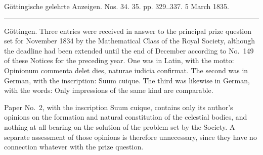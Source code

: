 \clearpage
{}
\begin{center}\small Göttingische gelehrte Anzeigen. Nos. 34. 35. pp. 329..337. 5 March 1835.\\[3pt]\rule{.72\linewidth}{.3pt}\end{center}

Göttingen. Three entries were received in answer to the principal prize question set for November 1834 by the Mathematical Class of the Royal Society, although the deadline had been extended until the end of December according to No.~149 of these Notices for the preceding year. One was in Latin, with the motto: Opinionum commenta delet dies, naturae iudicia confirmat. The second was in German, with the inscription: Suum cuique. The third was likewise in German, with the words: Only impressions of the same kind are comparable.

Paper No.~2, with the inscription Suum cuique, contains only its author's opinions on the formation and natural constitution of the celestial bodies, and nothing at all bearing on the solution of the problem set by the Society. A separate assessment of those opinions is therefore unnecessary, since they have no connection whatever with the prize question.

